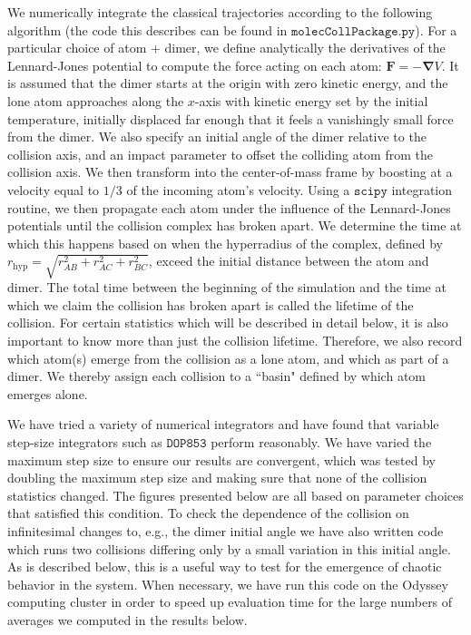\documentclass[%
 reprint,
 amsmath,amssymb,
 aps,
 nofootinbib
]{revtex4-1}
\begin{document}
 We numerically integrate the classical trajectories according to the following algorithm (the code this describes can be found in $\texttt{molecCollPackage.py}$). For a particular choice of atom + dimer, we define analytically the derivatives of the Lennard-Jones potential to compute the force acting on each atom: $\mathbf{F} = -\mathbf{\nabla}V$. It is assumed that the dimer starts at the origin with zero kinetic energy, and the lone atom approaches along the $x$-axis with kinetic energy set by the initial temperature, initially displaced far enough that it feels a vanishingly small force from the dimer. We also specify an initial angle of the dimer relative to the collision axis, and an impact parameter to offset the colliding atom from the collision axis. We then transform into the center-of-mass frame by boosting at a velocity equal to $1/3$ of the incoming atom's velocity. Using a $\texttt{scipy}$ integration routine, we then propagate each atom under the influence of the Lennard-Jones potentials until the collision complex has broken apart. We determine the time at which this happens based on when the hyperradius of the complex, defined by $r_\text{hyp} = \sqrt{r_{AB}^2 + r_{AC}^2 + r_{BC}^2}$, exceed the initial distance between the atom and dimer. The total time between the beginning of the simulation and the time at which we claim the collision has broken apart is called the lifetime of the collision. For certain statistics which will be described in detail below, it is also important to know more than just the collision lifetime. Therefore, we also record which atom(s) emerge from the collision as a lone atom, and which as part of a dimer. We thereby assign each collision to a ``basin" defined by which atom emerges alone.

We have tried a variety of numerical integrators and have found that variable step-size integrators such as $\texttt{DOP853}$ perform reasonably. We have varied the maximum step size to ensure our results are convergent, which was tested by doubling the maximum step size and making sure that none of the collision statistics changed. The figures presented below are all based on parameter choices that satisfied this condition. To check the dependence of the collision on infinitesimal changes to, e.g., the dimer initial angle we have also written code which runs two collisions differing only by a small variation in this initial angle. As is described below, this is a useful way to test for the emergence of chaotic behavior in the system. When necessary, we have run this code on the Odyssey computing cluster in order to speed up evaluation time for the large numbers of averages we computed in the results below.
\end{document}
